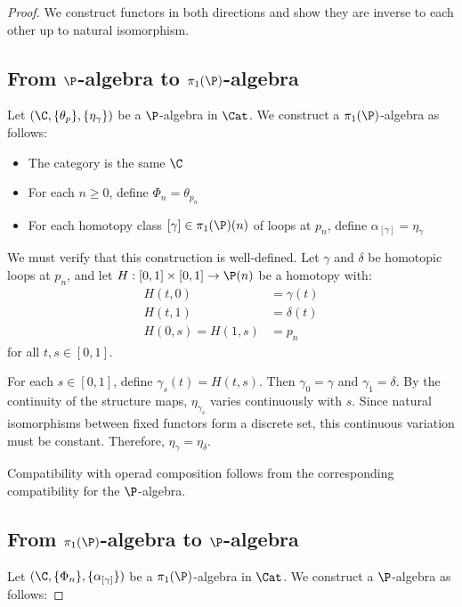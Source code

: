 \begin{proof}
We construct functors in both directions and show they are inverse to each other up to natural isomorphism.

\subsection{From $\P$-algebra to $\pi_1(\P)$-algebra}

Let $(\C, \{\theta_p\}, \{\eta_\gamma\})$ be a $\P$-algebra in $\Cat$. We construct a $\pi_1(\P)$-algebra as follows:

\begin{itemize}
    \item The category is the same $\C$
    \item For each $n \geq 0$, define $\Phi_n = \theta_{p_n}$
    \item For each homotopy class $[\gamma] \in \pi_1(\P)(n)$ of loops at $p_n$, define $\alpha_{[\gamma]} = \eta_\gamma$
\end{itemize}

We must verify that this construction is well-defined. Let $\gamma$ and $\delta$ be homotopic loops at $p_n$, and let $H: [0,1] \times [0,1] \to \P(n)$ be a homotopy with:
\begin{align}
    H(t, 0) &= \gamma(t) \\
    H(t, 1) &= \delta(t) \\
    H(0, s) = H(1, s) &= p_n
\end{align}
for all $t, s \in [0,1]$.

For each $s \in [0,1]$, define $\gamma_s(t) = H(t, s)$. Then $\gamma_0 = \gamma$ and $\gamma_1 = \delta$. By the continuity of the structure maps, $\eta_{\gamma_s}$ varies continuously with $s$. Since natural isomorphisms between fixed functors form a discrete set, this continuous variation must be constant. Therefore, $\eta_\gamma = \eta_\delta$.

Compatibility with operad composition follows from the corresponding compatibility for the $\P$-algebra.

\subsection{From $\pi_1(\P)$-algebra to $\P$-algebra}

Let $(\C, \{\Phi_n\}, \{\alpha_{[\gamma]}\})$ be a $\pi_1(\P)$-algebra in $\Cat$. We construct a $\P$-algebra as follows:


\end{proof}
